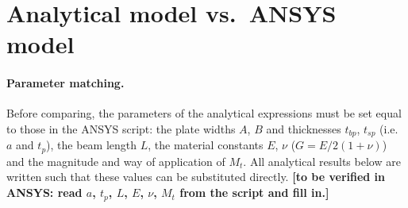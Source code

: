 \section{Analytical model vs.\ ANSYS model}

\paragraph{Parameter matching.}
Before comparing, the parameters of the analytical expressions must be set equal to those in the ANSYS script: the plate widths $A$, $B$ and thicknesses $t_{bp}$, $t_{sp}$ (i.e.\ $a$ and $t_p$), the beam length $L$, the material constants $E$, $\nu$ ($G=E/2(1+\nu)$) and the magnitude and way of application of $M_t$. All analytical results below are written such that these values can be substituted directly. \textbf{[to be verified in ANSYS: read $a$, $t_p$, $L$, $E$, $\nu$, $M_t$ from the script and fill in.]}


